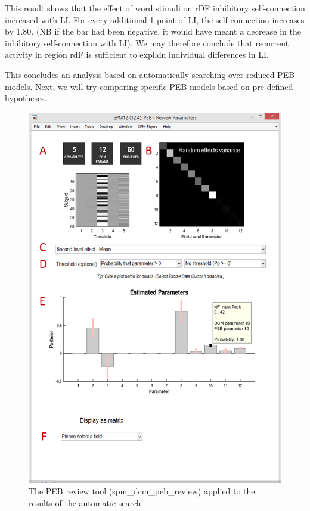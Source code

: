 \documentclass{article}
\begin{document}
This result shows that the effect of word stimuli on rDF inhibitory self-connection increased with LI. For every additional 1 point of LI, the self-connection increases by 1.80. (NB if the bar had been negative, it would have meant a decrease in the inhibitory self-connection with LI). We may therefore conclude that recurrent activity in region rdF is sufficient to explain individual differences in LI.

This concludes an analysis based on automatically searching over reduced PEB models. Next, we will try comparing specific PEB models based on pre-defined hypotheses.

\begin{figure}[ht]
\begin{center}
\includegraphics{"Fig_peb_search_review"}
\caption{The PEB review tool (spm\_dcm\_peb\_review) applied to the results of the automatic search.\label{Fig_peb_search_review}}
\end{center}
\end{figure}
\end{document}
